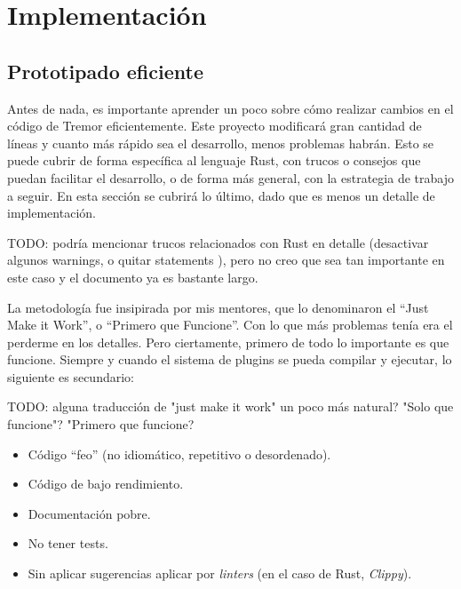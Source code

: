 
\chapter{Implementación}

\section{Prototipado eficiente}

\newcommand{\work}{``Primero que Funcione''\xspace}

Antes de nada, es importante aprender un poco sobre cómo realizar cambios en el
código de Tremor eficientemente. Este proyecto modificará gran cantidad de
líneas y cuanto más rápido sea el desarrollo, menos problemas habrán. Esto se
puede cubrir de forma específica al lenguaje Rust, con trucos o consejos que
puedan facilitar el desarrollo, o de forma más general, con la estrategia de
trabajo a seguir. En esta sección se cubrirá lo último, dado que es menos un
detalle de implementación.

TODO: podría mencionar trucos relacionados con Rust en detalle (desactivar
algunos warnings, o quitar statements ), pero no creo que sea tan
importante en este caso y el documento ya es bastante largo.

La metodología fue insipirada por mis mentores, que lo denominaron el ``Just
Make it Work'', o \work. Con lo que más problemas tenía era el perderme en los
detalles. Pero ciertamente, primero de todo lo importante es que funcione.
Siempre y cuando el sistema de plugins se pueda compilar y ejecutar, lo
siguiente es secundario:

TODO: alguna traducción de "just make it work" un poco más natural? "Solo que
funcione"? "Primero que funcione?

\begin{itemize}
    \item Código ``feo'' (no idiomático, repetitivo o desordenado).

    \item Código de bajo rendimiento.

    \item Documentación pobre.

    \item No tener tests.

    \item Sin aplicar sugerencias aplicar por \emph{linters} (en el caso de
        Rust, \emph{Clippy}).

\end{itemize}


